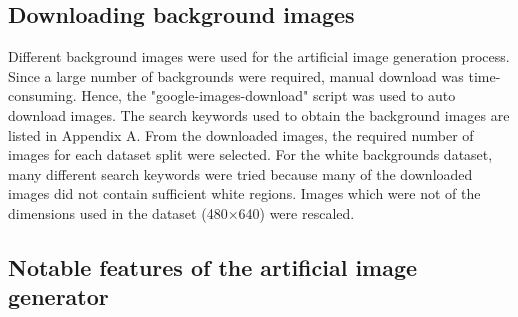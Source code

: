 \subsection{Downloading background images}
Different background images were used for the artificial image generation process. Since a large number of backgrounds were required, manual download was time-consuming. Hence, the "google-images-download" \cite{image_downloader} script was used to auto download images. The search keywords used to obtain the background images are listed in Appendix A. From the downloaded images, the required number of images for each dataset split were selected. For the white backgrounds dataset, many different search keywords were tried because many of the downloaded images did not contain sufficient white regions. Images which were not of the dimensions used in the dataset (480$\times$640) were rescaled.

	
\subsection{Notable features of the artificial image generator}


